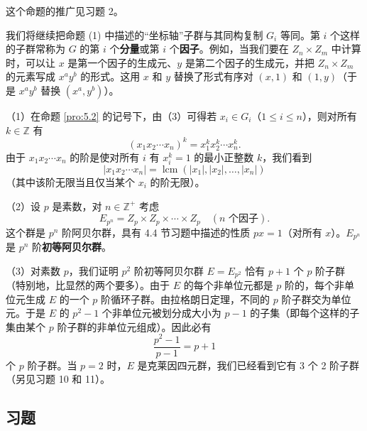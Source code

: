 这个命题的推广见习题 2。

我们将继续把命题 (1) 中描述的“坐标轴”子群与其同构复制 \(G_i\) 等同。第 \(i\) 个这样的子群常称为 \(G\) 的第 \(i\) 个\textbf{分量}或第 \(i\) 个\textbf{因子}。例如，当我们要在 \(Z_n \times Z_m\) 中计算时，可以让 \(x\) 是第一个因子的生成元、\(y\) 是第二个因子的生成元，并把 \(Z_n \times Z_m\) 的元素写成 \(x^a y^b\) 的形式。这用 \(x\) 和 \(y\) 替换了形式有序对 \((x, 1)\) 和 \((1, y)\)（于是 \(x^a y^b\) 替换 \((x^a, y^b)\)）。

\begin{example}
（1）在命题 \ref{pro:5.2} 的记号下，由（3）可得若 \(x_i \in G_i\)（\(1 \leq i \leq n\)），则对所有 \(k \in \mathbb{Z}\) 有
\[
(x_1 x_2 \cdots x_n)^k = x_1^k x_2^k \cdots x_n^k.
\]
由于 \(x_1x_2\cdots x_n\) 的阶是使对所有 \(i\) 有 \(x_i^k = 1\) 的最小正整数 \(k\)，我们看到
\[
|x_1x_2\cdots x_n| = \operatorname{lcm}(|x_1|, |x_2|, \ldots, |x_n|)
\]
（其中该阶无限当且仅当某个 \(x_i\) 的阶无限）。

（2）设 \(p\) 是素数，对 \(n \in \mathbb{Z}^+\) 考虑
\[
E_{p^n} = Z_p \times Z_p \times \cdots \times Z_p \quad (n \text{ 个因子}).
\]
这个群是 \(p^n\) 阶阿贝尔群，具有 4.4 节习题中描述的性质 \(px = 1\)（对所有 \(x\)）。\(E_{p^n}\) 是 \(p^n\) 阶\textbf{初等阿贝尔群}。

（3）对素数 \(p\)，我们证明 \(p^2\) 阶初等阿贝尔群 \(E = E_{p^2}\) 恰有 \(p+1\) 个 \(p\) 阶子群（特别地，比显然的两个要多）。由于 \(E\) 的每个非单位元都是 \(p\) 阶的，每个非单位元生成 \(E\) 的一个 \(p\) 阶循环子群。由拉格朗日定理，不同的 \(p\) 阶子群交为单位元。于是 \(E\) 的 \(p^2 - 1\) 个非单位元被划分成大小为 \(p-1\) 的子集（即每个这样的子集由某个 \(p\) 阶子群的非单位元组成）。因此必有
\[
\frac{p^2 - 1}{p - 1} = p + 1
\]
个 \(p\) 阶子群。当 \(p = 2\) 时，\(E\) 是克莱因四元群，我们已经看到它有 3 个 2 阶子群（另见习题 10 和 11）。
\end{example}

\subsection*{习题}

